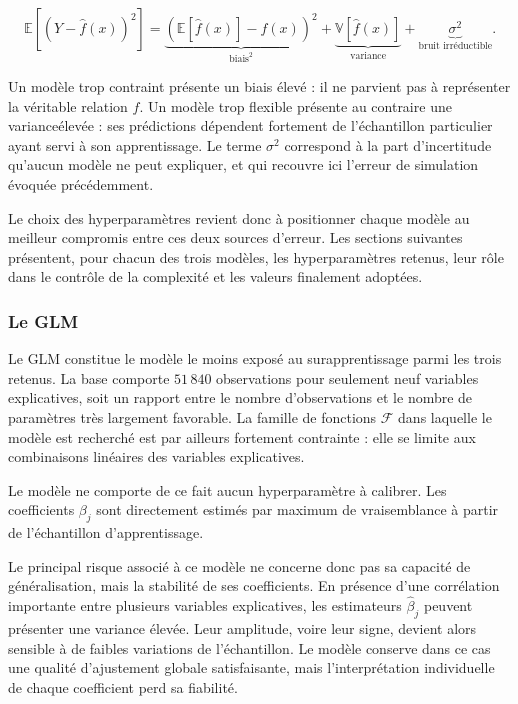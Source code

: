\begin{equation}
\mathbb{E}\left[\left(Y - \hat{f}(x)\right)^2\right]
= \underbrace{\left(\mathbb{E}\left[\hat{f}(x)\right] - f(x)\right)^2}_{\text{biais}^2}
+ \underbrace{\mathbb{V}\left[\hat{f}(x)\right]}_{\text{variance}}
+ \underbrace{\sigma^2}_{\text{bruit irréductible}}.
\label{eq:biais-variance}
\end{equation}

Un modèle trop contraint présente un biais élevé : il ne parvient pas à représenter la véritable relation $f$. Un modèle trop flexible présente au contraire une varianceélevée : ses prédictions dépendent fortement de l'échantillon particulier ayant servi à son apprentissage. Le terme $\sigma^2$ correspond à la part d'incertitude qu'aucun modèle ne peut expliquer, et qui recouvre ici l'erreur de simulation évoquée précédemment.

Le choix des hyperparamètres revient donc à positionner chaque modèle au meilleur compromis entre ces deux sources d'erreur. Les sections suivantes présentent, pour chacun des trois modèles, les hyperparamètres retenus, leur rôle dans le contrôle de la complexité et les valeurs finalement adoptées.

\subsubsection{Le GLM}

Le GLM constitue le modèle le moins exposé au surapprentissage parmi les trois retenus. La base comporte $51\,840$ observations pour seulement neuf variables explicatives, soit un rapport entre le nombre d'observations et le nombre de paramètres très largement favorable. La famille de fonctions $\mathcal{F}$ dans laquelle le modèle est recherché est par ailleurs fortement contrainte : elle se limite aux combinaisons linéaires des variables explicatives.

Le modèle ne comporte de ce fait aucun hyperparamètre à calibrer. Les coefficients $\beta_j$ sont directement estimés par maximum de vraisemblance à partir de l'échantillon d'apprentissage.

Le principal risque associé à ce modèle ne concerne donc pas sa capacité de généralisation, mais la stabilité de ses coefficients. En présence d'une corrélation importante entre plusieurs variables explicatives, les estimateurs $\hat{\beta}_j$ peuvent présenter une variance élevée. Leur amplitude, voire leur signe, devient alors sensible à de faibles variations de l'échantillon. Le modèle conserve dans ce cas une qualité d'ajustement globale satisfaisante, mais l'interprétation individuelle de chaque coefficient perd sa fiabilité.

